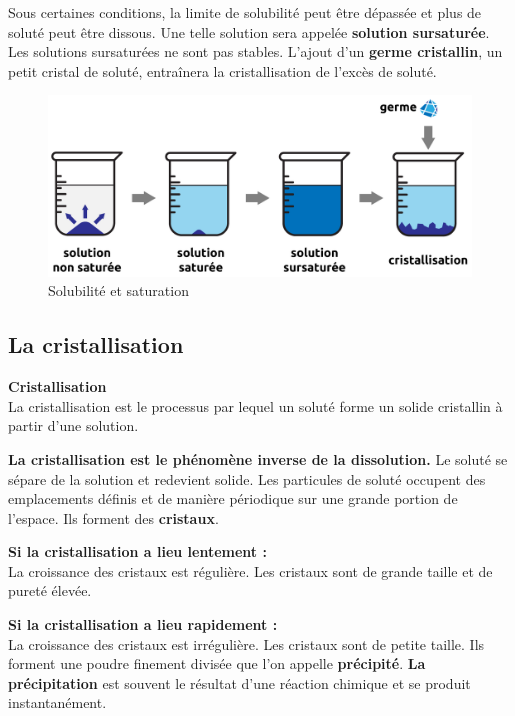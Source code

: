 \documentclass[
  11pt,
  french,
  a4paper,
  openany]{book}
\begin{document}
Sous certaines conditions, la limite de solubilité peut être dépassée et plus de soluté peut être dissous. Une telle solution sera appelée \textbf{solution sursaturée}. Les solutions sursaturées ne sont pas stables. L'ajout d'un \textbf{germe cristallin}, un petit cristal de soluté, entraînera la cristallisation de l'excès de soluté.

\begin{figure}

{\centering \includegraphics[width=0.67\linewidth]{images/solution} 

}

\caption{Solubilité et saturation}\label{fig:solubilite-saturation}
\end{figure}

\hypertarget{la-cristallisation}{%
\subsection{La cristallisation}\label{la-cristallisation}}

\begin{tcolorbox}
\textbf{Cristallisation}\\
La cristallisation est le processus par lequel un soluté forme un solide cristallin à partir d'une solution.

\end{tcolorbox}

\textbf{La cristallisation est le phénomène inverse de la dissolution.} Le soluté se sépare de la solution et redevient solide. Les particules de soluté occupent des emplacements définis et de manière périodique sur une grande portion de l'espace. Ils forment des \textbf{cristaux}.

\textbf{Si la cristallisation a lieu lentement :}\\
La croissance des cristaux est régulière. Les cristaux sont de grande taille et de pureté élevée.

\textbf{Si la cristallisation a lieu rapidement :}\\
La croissance des cristaux est irrégulière. Les cristaux sont de petite taille. Ils forment une poudre finement divisée que l'on appelle \textbf{précipité}. \textbf{La précipitation} est souvent le résultat d'une réaction chimique et se produit instantanément.
\end{document}
